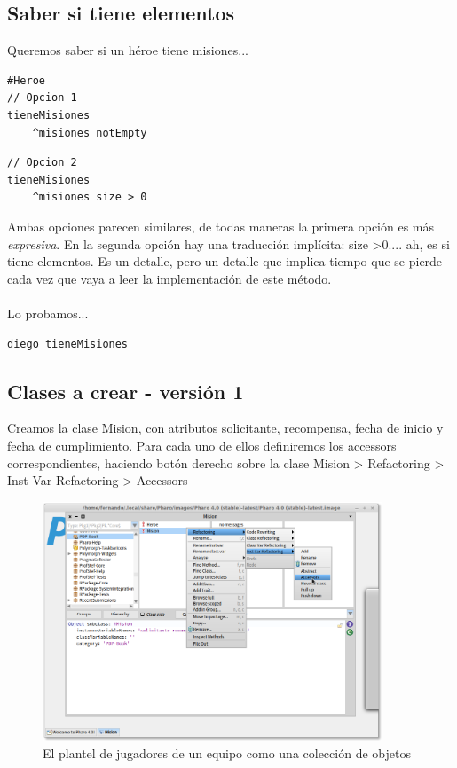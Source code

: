 \documentclass[a4paper,12pt]{book}
\begin{document}
\subsection{Saber si tiene elementos}
Queremos saber si un héroe tiene misiones...

\begin{lstlisting}[frame=single]
#Heroe
// Opcion 1
tieneMisiones
    ^misiones notEmpty
\end{lstlisting}

    
\begin{lstlisting}[frame=single]
// Opcion 2
tieneMisiones
    ^misiones size > 0
\end{lstlisting}

Ambas opciones parecen similares, de todas maneras la primera opción es más \textit{expresiva}. En la segunda
opción hay una traducción implícita: size \textgreater  0.... ah, es si tiene elementos. Es un detalle, 
pero un detalle que implica tiempo que se pierde cada vez que vaya a leer la implementación de este método.
\\
\\
Lo probamos...
\begin{lstlisting}[frame=single]
diego tieneMisiones
\end{lstlisting}

\subsection{Clases a crear - versión 1}
Creamos la clase Mision, con atributos solicitante, recompensa, fecha de inicio y fecha de cumplimiento. 
Para cada uno de ellos definiremos los accessors correspondientes, haciendo botón derecho sobre la clase
Mision > Refactoring > Inst Var Refactoring > Accessors 
\begin{figure}[h!]
    \centering
    \includegraphics[width=0.9\textwidth]{images/10_accessors.png}
    \caption{El plantel de jugadores de un equipo como una colección de objetos}
\end{figure}
\end{document}
